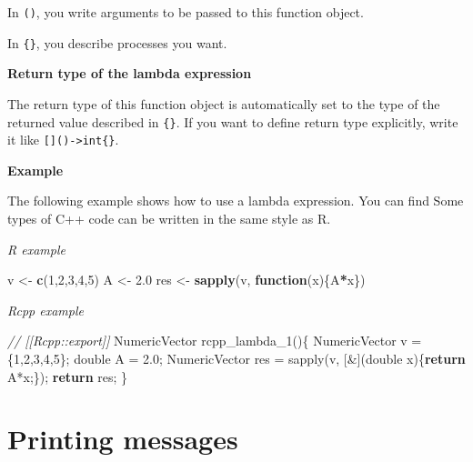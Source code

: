 \documentclass[]{book}
\newenvironment{Shaded}{\begin{snugshade}}{\end{snugshade}}
\newcommand{\CommentTok}[1]{\textcolor[rgb]{0.56,0.35,0.01}{\textit{#1}}}
\newcommand{\ControlFlowTok}[1]{\textcolor[rgb]{0.13,0.29,0.53}{\textbf{#1}}}
\newcommand{\DataTypeTok}[1]{\textcolor[rgb]{0.13,0.29,0.53}{#1}}
\newcommand{\DecValTok}[1]{\textcolor[rgb]{0.00,0.00,0.81}{#1}}
\newcommand{\FloatTok}[1]{\textcolor[rgb]{0.00,0.00,0.81}{#1}}
\newcommand{\KeywordTok}[1]{\textcolor[rgb]{0.13,0.29,0.53}{\textbf{#1}}}
\newcommand{\NormalTok}[1]{#1}
\newcommand{\OperatorTok}[1]{\textcolor[rgb]{0.81,0.36,0.00}{\textbf{#1}}}
\newcommand{\StringTok}[1]{\textcolor[rgb]{0.31,0.60,0.02}{#1}}
\begin{document}
In \texttt{()}, you write arguments to be passed to this function object.

In \texttt{\{\}}, you describe processes you want.

\textbf{Return type of the lambda expression}

The return type of this function object is automatically set to the type of the returned value described in \texttt{\{\}}. If you want to define return type explicitly, write it like \texttt{{[}{]}()-\textgreater{}int\{\}}.

\textbf{Example}

The following example shows how to use a lambda expression. You can find Some types of C++ code can be written in the same style as R.

\emph{R example}

\begin{Shaded}
\begin{Highlighting}[]
\NormalTok{v <-}\StringTok{ }\KeywordTok{c}\NormalTok{(}\DecValTok{1}\NormalTok{,}\DecValTok{2}\NormalTok{,}\DecValTok{3}\NormalTok{,}\DecValTok{4}\NormalTok{,}\DecValTok{5}\NormalTok{)}
\NormalTok{A <-}\StringTok{ }\FloatTok{2.0}
\NormalTok{res <-}
\StringTok{  }\KeywordTok{sapply}\NormalTok{(v, }\ControlFlowTok{function}\NormalTok{(x)\{A}\OperatorTok{*}\NormalTok{x\})}
\end{Highlighting}
\end{Shaded}

\emph{Rcpp example}

\begin{Shaded}
\begin{Highlighting}[]
\CommentTok{// [[Rcpp::export]]}
\NormalTok{NumericVector rcpp_lambda_1()\{}
\NormalTok{  NumericVector v = \{}\DecValTok{1}\NormalTok{,}\DecValTok{2}\NormalTok{,}\DecValTok{3}\NormalTok{,}\DecValTok{4}\NormalTok{,}\DecValTok{5}\NormalTok{\};}
  \DataTypeTok{double}\NormalTok{ A = }\FloatTok{2.0}\NormalTok{;}
\NormalTok{  NumericVector res =}
\NormalTok{    sapply(v, [&](}\DataTypeTok{double}\NormalTok{ x)\{}\ControlFlowTok{return}\NormalTok{ A*x;\});}
  \ControlFlowTok{return}\NormalTok{ res;}
\NormalTok{\}}
\end{Highlighting}
\end{Shaded}

\hypertarget{printing-messages}{%
\chapter{Printing messages}\label{printing-messages}}
\end{document}
